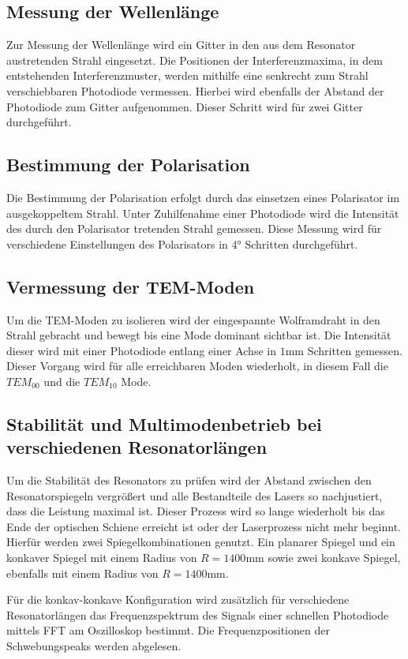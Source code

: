 \subsection{Messung der Wellenlänge}
Zur Messung der Wellenlänge wird ein Gitter in den aus dem Resonator austretenden Strahl eingesetzt. Die Positionen der Interferenzmaxima, in dem entstehenden Interferenzmuster, werden mithilfe eine senkrecht zum Strahl verschiebbaren Photodiode
vermessen. Hierbei wird ebenfalls der Abstand der Photodiode zum Gitter aufgenommen. Dieser Schritt wird für zwei Gitter durchgeführt.

\subsection{Bestimmung der Polarisation}
Die Bestimmung der Polarisation erfolgt durch das einsetzen eines Polarisator im ausgekoppeltem Strahl. Unter Zuhilfenahme einer Photodiode wird die Intensität des durch den Polarisator tretenden Strahl gemessen. Diese Messung wird für
verschiedene Einstellungen des Polarisators in $4 \unit{\degree}$ Schritten durchgeführt.

\subsection{Vermessung der TEM-Moden}
Um die TEM-Moden zu isolieren wird der eingespannte Wolframdraht in den Strahl gebracht und bewegt bis eine Mode dominant sichtbar ist. Die Intensität dieser wird mit einer Photodiode entlang einer Achse in $1 \unit{\milli\meter}$ Schritten
gemessen. Dieser Vorgang wird für alle erreichbaren Moden wiederholt, in diesem Fall die $TEM_{00}$ und die $TEM_{10}$ Mode.

\subsection{Stabilität und Multimodenbetrieb bei verschiedenen Resonatorlängen}
Um die Stabilität des Resonators zu prüfen wird der Abstand zwischen den Resonatorspiegeln vergrößert und alle Bestandteile des Lasers so nachjustiert, dass die Leistung maximal ist. Dieser Prozess wird so lange wiederholt bis das Ende der 
optischen Schiene erreicht ist oder der Laserprozess nicht mehr beginnt. Hierfür werden zwei Spiegelkombinationen genutzt. Ein planarer Spiegel und ein konkaver Spiegel mit einem Radius von $R = 1400 \unit{\milli\meter}$ sowie zwei konkave 
Spiegel, ebenfalls mit einem Radius von $R = 1400 \unit{\milli\meter}$.

Für die konkav-konkave Konfiguration wird zusätzlich für verschiedene Resonatorlängen
das Frequenzspektrum des Signals einer schnellen Photodiode mittels FFT am
Oszilloskop bestimmt. Die Frequenzpositionen der Schwebungspeaks werden abgelesen.
